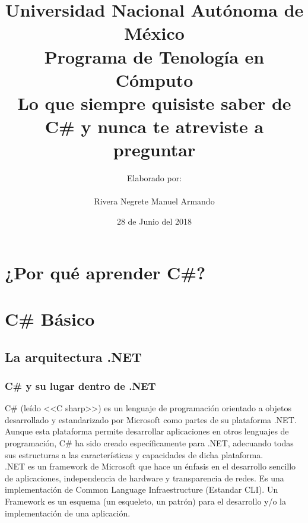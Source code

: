 \documentclass[12pt,a4paper]{report}
\author{Elaborado por:\\\\Rivera Negrete Manuel Armando}
\date{28 de Junio del 2018}
\title{Universidad Nacional Autónoma de México\\Programa de Tenología en Cómputo\\Lo que siempre quisiste saber de C\# y nunca te atreviste a preguntar}
\begin{document}
\maketitle
\tableofcontents
\cleardoublepage
\part*{¿Por qué aprender C\#?}

\part{C\# Básico}

\chapter{La arquitectura .NET}
\section{C\# y su lugar dentro de .NET}
C\# (leído <<C sharp>>) es un lenguaje de programación orientado a objetos desarrollado y estandarizado por Microsoft como partes de su plataforma .NET. Aunque esta plataforma permite desarrollar aplicaciones en otros lenguajes de programación, C\# ha sido creado específicamente para .NET, adecuando todas sus estructuras a las características y capacidades de dicha plataforma.\\.NET es un framework de Microsoft que hace un énfasis en el desarrollo sencillo de aplicaciones, independencia de hardware y transparencia de redes. Es una implementación de Common Language Infraestructure (Estandar CLI). Un Framework es un esquema (un esqueleto, un patrón) para el desarrollo y/o la implementación de una aplicación.
\end{document}
